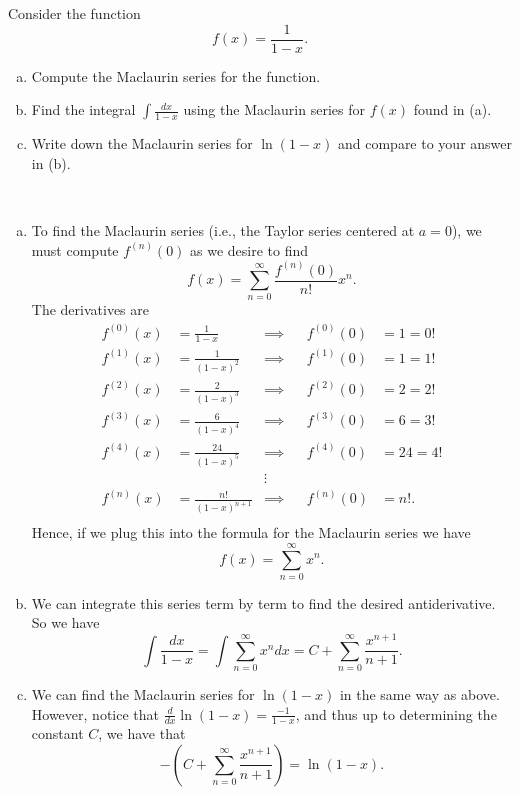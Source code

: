 \documentclass[12pt]{article} %
\begin{document}
\newpage
\begin{problem} Consider the function
\[
f(x)=\frac{1}{1-x}.
\]
\begin{enumerate}[(a)]
    \item Compute the Maclaurin series for the function.
    \item Find the integral $\int \frac{dx}{1-x}$ using the Maclaurin series for $f(x)$ found in (a).  
    \item Write down the Maclaurin series for $\ln(1-x)$ and compare to your answer in (b).
\end{enumerate}
\end{problem}
\begin{solution}~
\begin{enumerate}[(a)]
    \item To find the Maclaurin series (i.e., the Taylor series centered at $a=0$), we must compute $f^{(n)}(0)$ as we desire to find
    \[
    f(x) = \sum_{n=0}^\infty \frac{f^{(n)}(0)}{n!}x^n.
    \]
    The derivatives are
    \begin{align*}
        f^{(0)}(x) &= \frac{1}{1-x} &\implies&& f^{(0)}(0)&=1=0!\\
        f^{(1)}(x) &= \frac{1}{(1-x)^2} &\implies&& f^{(1)}(0)&=1=1!\\
        f^{(2)}(x) &= \frac{2}{(1-x)^3} &\implies&& f^{(2)}(0)&=2=2!\\
        f^{(3)}(x) &= \frac{6}{(1-x)^4} &\implies&& f^{(3)}(0)&=6=3!\\
        f^{(4)}(x) &= \frac{24}{(1-x)^5} &\implies&& f^{(4)}(0)&=24=4!\\
        && \vdots && &\\
        f^{(n)}(x) &= \frac{n!}{(1-x)^{n+1}} &\implies&& f^{(n)}(0)&=n!.\\
    \end{align*}
    Hence, if we plug this into the formula for the Maclaurin series we have
    \[
    f(x) = \sum_{n=0}^\infty x^n.
    \]
    \item We can integrate this series term by term to find the desired antiderivative. So we have
    \[
    \int\frac{dx}{1-x} = \int \sum_{n=0}^\infty x^n dx = C + \sum_{n=0}^\infty \frac{x^{n+1}}{n+1}.
    \]
    \item We can find the Maclaurin series for $\ln(1-x)$ in the same way as above. However, notice that $\frac{d}{dx} \ln(1-x) =\frac{-1}{1-x}$, and thus up to determining the constant $C$, we have that
    \[
    -\left(C + \sum_{n=0}^\infty \frac{x^{n+1}}{n+1}\right) = \ln(1-x).
    \]
\end{enumerate}
\end{solution}
\end{document}
